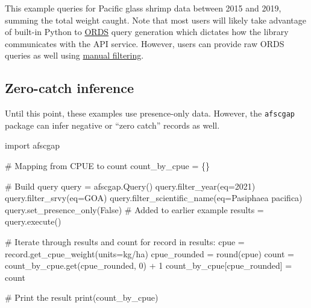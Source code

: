 \documentclass[
  letterpaper,
  oneside,
  open=any]{scrbook}
\newenvironment{Shaded}{\begin{snugshade}}{\end{snugshade}}
\newcommand{\AttributeTok}[1]{\textcolor[rgb]{0.40,0.45,0.13}{#1}}
\newcommand{\CommentTok}[1]{\textcolor[rgb]{0.37,0.37,0.37}{#1}}
\newcommand{\ControlFlowTok}[1]{\textcolor[rgb]{0.00,0.23,0.31}{#1}}
\newcommand{\DecValTok}[1]{\textcolor[rgb]{0.68,0.00,0.00}{#1}}
\newcommand{\FunctionTok}[1]{\textcolor[rgb]{0.28,0.35,0.67}{#1}}
\newcommand{\NormalTok}[1]{\textcolor[rgb]{0.00,0.23,0.31}{#1}}
\newcommand{\OtherTok}[1]{\textcolor[rgb]{0.00,0.23,0.31}{#1}}
\newcommand{\SpecialCharTok}[1]{\textcolor[rgb]{0.37,0.37,0.37}{#1}}
\newcommand{\StringTok}[1]{\textcolor[rgb]{0.13,0.47,0.30}{#1}}
\begin{document}
This example queries for Pacific glass shrimp data between 2015 and
2019, summing the total weight caught. Note that most users will likely
take advantage of built-in Python to
\href{https://www.oracle.com/database/technologies/appdev/rest.html}{ORDS}
query generation which dictates how the library communicates with the
API service. However, users can provide raw ORDS queries as well using
\href{https://pyafscgap.org/devdocs/afscgap.html\#manual-filtering}{manual
filtering}.

\subsection{Zero-catch inference}\label{zero-catch-inference}

Until this point, these examples use presence-only data. However, the
\texttt{afscgap} package can infer negative or ``zero catch'' records as
well.

\begin{Shaded}
\begin{Highlighting}[]
\NormalTok{import afscgap}

\CommentTok{\# Mapping from CPUE to count}
\NormalTok{count\_by\_cpue }\OtherTok{=}\NormalTok{ \{\}}

\CommentTok{\# Build query}
\NormalTok{query }\OtherTok{=} \FunctionTok{afscgap.Query}\NormalTok{()}
\FunctionTok{query.filter\_year}\NormalTok{(}\AttributeTok{eq=}\DecValTok{2021}\NormalTok{)}
\FunctionTok{query.filter\_srvy}\NormalTok{(}\AttributeTok{eq=}\StringTok{\textquotesingle{}GOA\textquotesingle{}}\NormalTok{)}
\FunctionTok{query.filter\_scientific\_name}\NormalTok{(}\AttributeTok{eq=}\StringTok{\textquotesingle{}Pasiphaea pacifica\textquotesingle{}}\NormalTok{)}
\FunctionTok{query.set\_presence\_only}\NormalTok{(False)  }\CommentTok{\# Added to earlier example}
\NormalTok{results }\OtherTok{=} \FunctionTok{query.execute}\NormalTok{()}

\CommentTok{\# Iterate through results and count}
\ControlFlowTok{for}\NormalTok{ record }\ControlFlowTok{in}\NormalTok{ results}\SpecialCharTok{:}
\NormalTok{  cpue }\OtherTok{=} \FunctionTok{record.get\_cpue\_weight}\NormalTok{(}\AttributeTok{units=}\StringTok{\textquotesingle{}kg/ha\textquotesingle{}}\NormalTok{)}
\NormalTok{  cpue\_rounded }\OtherTok{=} \FunctionTok{round}\NormalTok{(cpue)}
\NormalTok{  count }\OtherTok{=} \FunctionTok{count\_by\_cpue.get}\NormalTok{(cpue\_rounded, }\DecValTok{0}\NormalTok{) }\SpecialCharTok{+} \DecValTok{1}
\NormalTok{  count\_by\_cpue[cpue\_rounded] }\OtherTok{=}\NormalTok{ count}

\CommentTok{\# Print the result}
\FunctionTok{print}\NormalTok{(count\_by\_cpue)}
\end{Highlighting}
\end{Shaded}
\end{document}
